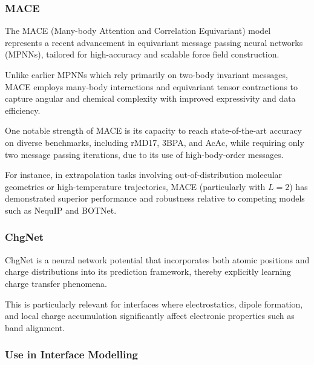 
\subsubsection{MACE}


The MACE (Many-body Attention and Correlation Equivariant) model represents a recent advancement in equivariant message
passing neural networks (MPNNs), tailored for high-accuracy and scalable force field construction.

Unlike earlier MPNNs which rely primarily on two-body invariant messages, MACE employs many-body interactions and
equivariant tensor contractions to capture angular and chemical complexity with improved expressivity and data
efficiency.


One notable strength of MACE is its capacity to reach state-of-the-art accuracy on diverse benchmarks, including rMD17,
3BPA, and AcAc, while requiring only two message passing iterations, due to its use of high-body-order messages.

For instance, in extrapolation tasks involving out-of-distribution molecular geometries or high-temperature
trajectories, MACE (particularly with $L=2$) has demonstrated superior performance and robustness relative to competing
models such as NequIP and BOTNet.


\subsubsection{ChgNet}


ChgNet is a neural network potential that incorporates both atomic positions and charge distributions into its
prediction framework, thereby explicitly learning charge transfer phenomena.

This is particularly relevant for interfaces where electrostatics, dipole formation, and local charge accumulation
significantly affect electronic properties such as band alignment.



\subsubsection{Use in Interface Modelling}


